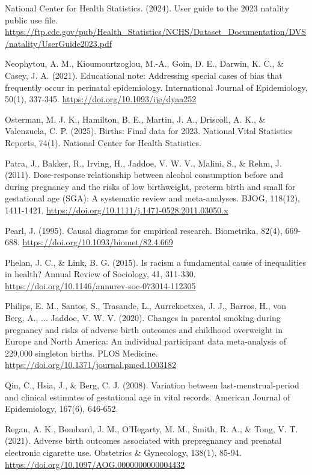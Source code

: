 \documentclass[11pt,letterpaper]{article}
\begin{document}
{National Center for Health Statistics. (2024). User guide to the 2023 natality public use file. \url{https://ftp.cdc.gov/pub/Health_Statistics/NCHS/Dataset_Documentation/DVS/natality/UserGuide2023.pdf}

Neophytou, A. M., Kioumourtzoglou, M.-A., Goin, D. E., Darwin, K. C., \& Casey, J. A. (2021). Educational note: Addressing special cases of bias that frequently occur in perinatal epidemiology. International Journal of Epidemiology, 50(1), 337-345. \url{https://doi.org/10.1093/ije/dyaa252}

Osterman, M. J. K., Hamilton, B. E., Martin, J. A., Driscoll, A. K., \& Valenzuela, C. P. (2025). Births: Final data for 2023. National Vital Statistics Reports, 74(1). National Center for Health Statistics.

Patra, J., Bakker, R., Irving, H., Jaddoe, V. W. V., Malini, S., \& Rehm, J. (2011). Dose-response relationship between alcohol consumption before and during pregnancy and the risks of low birthweight, preterm birth and small for gestational age (SGA): A systematic review and meta-analyses. BJOG, 118(12), 1411-1421. \url{https://doi.org/10.1111/j.1471-0528.2011.03050.x}

Pearl, J. (1995). Causal diagrams for empirical research. Biometrika, 82(4), 669-688. \url{https://doi.org/10.1093/biomet/82.4.669}

Phelan, J. C., \& Link, B. G. (2015). Is racism a fundamental cause of inequalities in health? Annual Review of Sociology, 41, 311-330. \url{https://doi.org/10.1146/annurev-soc-073014-112305}

Philips, E. M., Santos, S., Trasande, L., Aurrekoetxea, J. J., Barros, H., von Berg, A., ... Jaddoe, V. W. V. (2020). Changes in parental smoking during pregnancy and risks of adverse birth outcomes and childhood overweight in Europe and North America: An individual participant data meta-analysis of 229,000 singleton births. PLOS Medicine. \url{https://doi.org/10.1371/journal.pmed.1003182}

Qin, C., Hsia, J., \& Berg, C. J. (2008). Variation between last-menstrual-period and clinical estimates of gestational age in vital records. American Journal of Epidemiology, 167(6), 646-652.

Regan, A. K., Bombard, J. M., O'Hegarty, M. M., Smith, R. A., \& Tong, V. T. (2021). Adverse birth outcomes associated with prepregnancy and prenatal electronic cigarette use. Obstetrics \& Gynecology, 138(1), 85-94. \url{https://doi.org/10.1097/AOG.0000000000004432}

}
\end{document}
